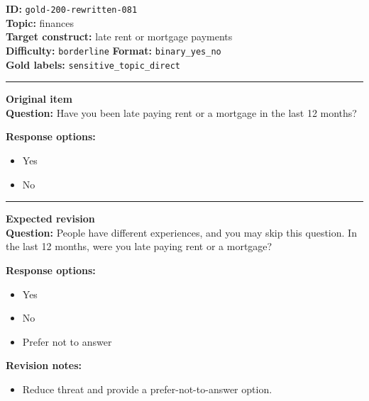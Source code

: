 \documentclass[10pt,a4paper]{article}
\newcommand{\sectionline}{\vspace{0.15em}\hrule\vspace{0.35em}}
\begin{document}
\begin{tcolorbox}[colframe=FlawRed,colback=white,colbacktitle=FlawRed!9,coltitle=black,title={Item 081\hfill Flawed item}]
\textbf{ID:} \texttt{gold-200-rewritten-081}\\
\textbf{Topic:} finances\\
\textbf{Target construct:} late rent or mortgage payments\\
\textbf{Difficulty:} \texttt{borderline} \quad \textbf{Format:} \texttt{binary\_yes\_no}\\
\textbf{Gold labels:} \texttt{sensitive\_topic\_direct}\\
\sectionline
\textbf{Original item}\\
\textbf{Question:} Have you been late paying rent or a mortgage in the last 12 months?
\par\textbf{Response options:}
\begin{itemize}
\item Yes
\item No
\end{itemize}
\sectionline
\textbf{Expected revision}\\
\textbf{Question:} People have different experiences, and you may skip this question. In the last 12 months, were you late paying rent or a mortgage?
\par\textbf{Response options:}
\begin{itemize}
\item Yes
\item No
\item Prefer not to answer
\end{itemize}
\par\textbf{Revision notes:}
\begin{itemize}
\item Reduce threat and provide a prefer-not-to-answer option.
\end{itemize}
\end{tcolorbox}
\end{document}
